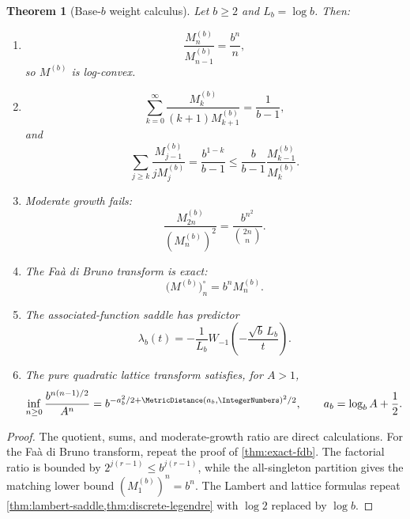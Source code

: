\documentclass[11pt,a4paper]{article}
\newtheorem{theorem}{Theorem}[section]
\theoremstyle{definition}
\theoremstyle{remark}
\begin{document}
\begin{theorem}[Base-$b$ weight calculus]
\label{thm:base-b}
Let $b\ge2$ and $L_b=\log b$.  Then:
\begin{enumerate}[label=(\roman*)]
\item
\begin{equation}
  \frac{M_n^{(b)}}{M_{n-1}^{(b)}}=\frac{b^n}{n},
  \label{eq:b-quotient}
\end{equation}
so $M^{(b)}$ is log-convex.
\item
\begin{equation}
 \sum_{k=0}^{\infty}
 \frac{M_k^{(b)}}{(k+1)M_{k+1}^{(b)}}
 =\frac1{b-1},
 \label{eq:b-nqa}
\end{equation}
and
\begin{equation}
 \sum_{j\ge k}\frac{M_{j-1}^{(b)}}{jM_j^{(b)}}
 =\frac{b^{1-k}}{b-1}
 \le\frac{b}{b-1}\frac{M_{k-1}^{(b)}}{M_k^{(b)}}.
 \label{eq:b-strong-nqa}
\end{equation}
\item Moderate growth fails:
\begin{equation}
  \frac{M_{2n}^{(b)}}{(M_n^{(b)})^2}
  =\frac{b^{n^2}}{\binom{2n}{n}}.
  \label{eq:b-moderate}
\end{equation}
\item The Fa\`a di Bruno transform is exact:
\begin{equation}
  \bigl(M^{(b)}\bigr)_n^\circ=b^nM_n^{(b)}.
  \label{eq:b-fdb}
\end{equation}
\item The associated-function saddle has predictor
\begin{equation}
 \lambda_b(t)=
 -\frac1{L_b}
 W_{-1}\!\left(-\frac{\sqrt b\,L_b}{t}\right).
 \label{eq:b-lambert}
\end{equation}
\item The pure quadratic lattice transform satisfies, for $A>1$,
\begin{equation}
 \inf_{n\ge0}\frac{b^{n(n-1)/2}}{A^n}
 =b^{-a_b^2/2+\MetricDistance(a_b,\IntegerNumbers)^2/2},
 \qquad
 a_b=\log_b A+\frac12.
 \label{eq:b-lattice}
\end{equation}
\end{enumerate}
\end{theorem}

\begin{proof}
The quotient, sums, and moderate-growth ratio are direct calculations.
For the Fa\`a di Bruno transform, repeat the proof of
\cref{thm:exact-fdb}.  The factorial ratio is bounded by
$2^{j(r-1)}\le b^{j(r-1)}$, while the all-singleton partition gives the matching
lower bound $(M_1^{(b)})^n=b^n$.  The Lambert and lattice formulas repeat
\cref{thm:lambert-saddle,thm:discrete-legendre} with $\log2$ replaced by $\log b$.
\end{proof}
\end{document}
